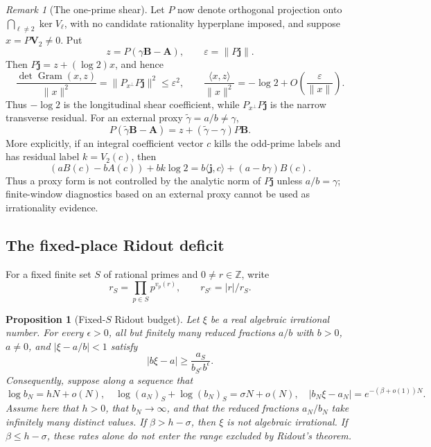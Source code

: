 \documentclass[11pt]{article}
\newtheorem{proposition}[theorem]{Proposition}
\theoremstyle{definition}
\theoremstyle{remark}
\newtheorem{remark}[theorem]{Remark}
\newcommand{\Z}{\mathbb Z}
\begin{document}
\begin{remark}[The one-prime shear]
Let \(P\) now denote orthogonal projection onto
\(\bigcap_{\ell\ne2}\ker V_\ell\), with no candidate rationality
hyperplane imposed, and suppose \(x=P\mathbf V_2\ne0\).  Put
\[
 z=P(\gamma\mathbf B-\mathbf A),
 \qquad \varepsilon=\|P\mathbf j\|.
\]
Then \(P\mathbf j=z+(\log2)x\), and hence
\begin{equation}\label{eq:log2-shear}
 \frac{\det\operatorname{Gram}(x,z)}{\|x\|^2}
 =\|P_{x^\perp}P\mathbf j\|^2\le\varepsilon^2,
 \qquad
 \frac{\langle x,z\rangle}{\|x\|^2}
 =-\log2+O\!\left(\frac\varepsilon{\|x\|}\right).
\end{equation}
Thus \(-\log2\) is the longitudinal shear coefficient, while
\(P_{x^\perp}P\mathbf j\) is the narrow transverse residual.  For an
external proxy \(\widetilde\gamma=a/b\ne\gamma\),
\[
 P(\widetilde\gamma\mathbf B-\mathbf A)
 =z+(\widetilde\gamma-\gamma)P\mathbf B.
\]
More explicitly, if an integral coefficient vector \(c\) kills the
odd-prime labels and has residual label \(k=V_2(c)\), then
\[
 (aB(c)-bA(c))+bk\log2
 =b\langle\mathbf j,c\rangle+(a-b\gamma)B(c).
\]
Thus a proxy form is not controlled by the analytic norm of \(P\mathbf j\)
unless \(a/b=\gamma\); finite-window diagnostics based on an external proxy
cannot be used as irrationality evidence.
\end{remark}

\subsection{The fixed-place Ridout deficit}

For a fixed finite set \(S\) of rational primes and \(0\ne r\in\Z\), write
\[
 r_S=\prod_{p\in S}p^{v_p(r)},
 \qquad r_{S^c}=|r|/r_S.
\]

\begin{proposition}[Fixed-\(S\) Ridout budget]
\label{prop:ridout-budget}
Let \(\xi\) be a real algebraic irrational number.  For every
\(\epsilon>0\), all but finitely many reduced fractions \(a/b\) with
\(b>0\), \(a\ne0\), and \(|\xi-a/b|<1\) satisfy
\begin{equation}\label{eq:ridout-linear-form}
 |b\xi-a|\ge\frac{a_S}{b_{S^c}b^\epsilon}.
\end{equation}
Consequently, suppose along a sequence that
\[
 \log b_N=hN+o(N),
 \quad
 \log(a_N)_S+\log(b_N)_S=\sigma N+o(N),
 \quad
 |b_N\xi-a_N|=e^{-(\beta+o(1))N}.
\]
Assume here that \(h>0\), that \(b_N\to\infty\), and that the reduced
fractions \(a_N/b_N\) take infinitely many distinct values.
If \(\beta>h-\sigma\), then \(\xi\) is not algebraic irrational.  If
\(\beta\le h-\sigma\), these rates alone do not enter the range excluded by
Ridout's theorem.
\end{proposition}
\end{document}
